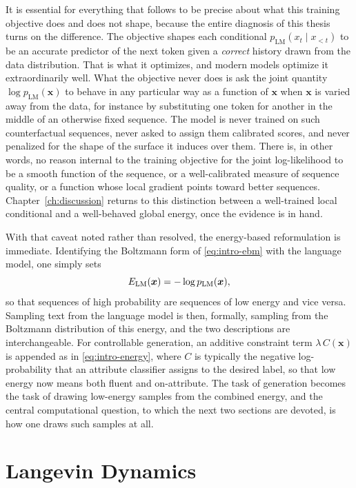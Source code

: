 It is essential for everything that follows to be precise about what this training objective does and does not shape, because the entire diagnosis of this thesis turns on the difference. The objective shapes each conditional $p_{\text{LM}}(x_t \mid x_{<t})$ to be an accurate predictor of the next token given a \emph{correct} history drawn from the data distribution. That is what it optimizes, and modern models optimize it extraordinarily well. What the objective never does is ask the joint quantity $\log p_{\text{LM}}(\bm{x})$ to behave in any particular way as a function of $\bm{x}$ when $\bm{x}$ is varied away from the data, for instance by substituting one token for another in the middle of an otherwise fixed sequence. The model is never trained on such counterfactual sequences, never asked to assign them calibrated scores, and never penalized for the shape of the surface it induces over them. There is, in other words, no reason internal to the training objective for the joint log-likelihood to be a smooth function of the sequence, or a well-calibrated measure of sequence quality, or a function whose local gradient points toward better sequences. Chapter~\ref{ch:discussion} returns to this distinction between a well-trained local conditional and a well-behaved global energy, once the evidence is in hand.

With that caveat noted rather than resolved, the energy-based reformulation is immediate. Identifying the Boltzmann form of \eqref{eq:intro-ebm} with the language model, one simply sets
\begin{equation}
    E_{\text{LM}}(\bm{x}) = -\log p_{\text{LM}}(\bm{x}),
    \label{eq:bg-energy}
\end{equation}
so that sequences of high probability are sequences of low energy and vice versa. Sampling text from the language model is then, formally, sampling from the Boltzmann distribution of this energy, and the two descriptions are interchangeable. For controllable generation, an additive constraint term $\lambda\, C(\bm{x})$ is appended as in \eqref{eq:intro-energy}, where $C$ is typically the negative log-probability that an attribute classifier assigns to the desired label, so that low energy now means both fluent and on-attribute. The task of generation becomes the task of drawing low-energy samples from the combined energy, and the central computational question, to which the next two sections are devoted, is how one draws such samples at all.

\section{Langevin Dynamics}
\label{sec:bg-langevin}

